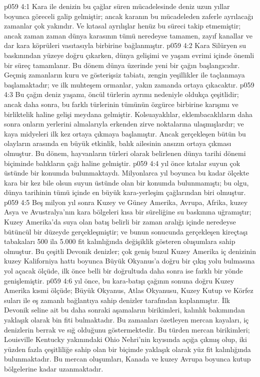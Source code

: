 \vs p059 4:1 Kara ile denizin bu çağlar süren mücadelesinde deniz uzun yıllar boyunca göreceli galip gelmiştir; ancak karanın bu mücadeleden zaferle ayrılacağı zamanlar çok yakındır. Ve kıtasal ayrılışlar henüz bu süreci takip etmemiştir; ancak zaman zaman dünya karasının tümü neredeyse tamamen, zayıf kanallar ve dar kara köprüleri vasıtasıyla birbirine bağlanmıştır.
\vs p059 4:2 Kara Silüryen su baskınından yüzeye doğru çıkarken, dünya gelişimi ve yaşam evrimi içinde önemli bir süreç tamamlanır. Bu dönem dünya üzerinde yeni bir çağın başlangıcıdır. Geçmiş zamanların kuru ve gösterişsiz tabiatı, zengin yeşillikler ile taçlanmaya başlamaktadır; ve ilk muhteşem ormanlar, yakın zamanda ortaya çıkacaktır.
\vs p059 4:3 Bu çağın deniz yaşamı, öncül türlerin ayrımı nedeniyle oldukça çeşitlidir; ancak daha sonra, bu farklı türlerinin tümünün özgürce birbirine karışımı ve birliktelik haline gelişi meydana gelmiştir. Kolsuayaklılar, eklembacaklıların daha sonra onların yerlerini almalarıyla erkenden zirve noktalarına ulaşmışlardır; ve kaya midyeleri ilk kez ortaya çıkmaya başlamıştır. Ancak gerçekleşen bütün bu olayların arasında en büyük etkinlik, balık ailesinin ansızın ortaya çıkması olmuştur. Bu dönem, hayvanların  türleri olarak belirlenen dünya tarihi dönemi biçiminde balıkların çağı haline gelmiştir.
\vs p059 4:4  yıl önce kıtalar suyun çok üstünde bir konumda bulunmaktaydı. Milyonlarca yıl boyunca bu kadar ölçekte kara bir kez bile olsun suyun üstünde olan bir konumda bulunmamıştı; bu olgu, dünya tarihinin tümü içinde en büyük kara\hyp{}yerleşim çağlarından biri olmuştur.
\vs p059 4:5 Beş milyon yıl sonra Kuzey ve Güney Amerika, Avrupa, Afrika, kuzey Asya ve Avustralya’nın kara bölgeleri kısa bir süreliğine su baskınına uğramıştır; Kuzey Amerika’da suya olan batış belirli bir zaman aralığı içinde neredeyse bütüncül bir düzeyde gerçekleşmiştir; ve bunun sonucunda gerçekleşen kireçtaşı tabakaları 500 ila 5.000 fit kalınlığında değişiklik gösteren oluşumlara sahip olmuştur. Bu çeşitli Devonik denizler; çok geniş buzul Kuzey Amerika iç denizinin kuzey Kaliforniya hattı boyunca Büyük Okyanus’a doğru bir çıkış yolu bulmasına yol açacak ölçüde, ilk önce belli bir doğrultuda daha sonra ise farklı bir yönde genişlemiştir.
\vs p059 4:6  yıl önce, bu kara\hyp{}batışı çağının sonuna doğru Kuzey Amerika kısmi ölçüde; Büyük Okyanus, Atlas Okyanusu, Kuzey Kutup ve Körfez suları ile eş zamanlı bağlantıya sahip denizler tarafından kaplanmıştır. İlk Devonik seline ait bu daha sonraki aşamaların birikimleri, kalınlık bakımından yaklaşık olarak bin fiti bulmaktadır. Bu zamanları özetleyen mercan kayaları, iç denizlerin berrak ve sığ olduğunu göstermektedir. Bu türden mercan birikimleri; Louisville Kentucky yakınındaki Ohio Nehri’nin kıyısında açığa çıkmış olup, iki yüzden fazla çeşitliliğe sahip olan bir biçimde yaklaşık olarak yüz fit kalınlığında bulunmaktadır. Bu mercan oluşumları, Kanada ve kuzey Avrupa boyunca kutup bölgelerine kadar uzanmaktadır.
